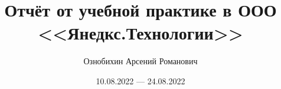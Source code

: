 \documentclass[12pt]{article}
\begin{document}
\small

	\makeFit

	\title{Отчёт от учебной практике в ООО <<Янедкс.Технологии>>}
	\author{Ознобихин Арсений Романович}
	\date{10.08.2022 --- 24.08.2022}
	
	\maketitle
	\tableofcontents

	
\end{document}
